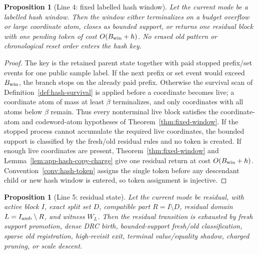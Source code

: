 \documentclass[11pt]{article}
\newtheorem{proposition}[theorem]{Proposition}
\theoremstyle{remark}
\begin{document}
\begin{proposition}[Line 4: fixed labelled hash window]\label{prop:line-hash}
Let the current mode be a labelled hash window.  Then the window either terminalizes on a budget overflow or large coordinate atom, closes as bounded support, or returns one residual block with one pending token of cost $O(B_{\rm win}+h)$.  No erased old pattern or chronological reset order enters the hash key.
\end{proposition}

\begin{proof}
The key is the retained parent state together with paid stopped prefix/set events for one public sample label.  If the next prefix or set event would exceed $B_{\rm win}$, the branch stops on the already paid prefix.  Otherwise the survival scan of Definition~\ref{def:hash-survival} is applied before a coordinate becomes live; a coordinate atom of mass at least $\beta$ terminalizes, and only coordinates with all atoms below $\beta$ remain.  Thus every nonterminal live block satisfies the coordinate-atom and codeword-atom hypotheses of Theorem~\ref{thm:fixed-window}.  If the stopped process cannot accumulate the required live coordinates, the bounded support is classified by the fresh/old residual rules and no token is created.  If enough live coordinates are present, Theorem~\ref{thm:fixed-window} and Lemma~\ref{lem:app-hash-copy-charge} give one residual return at cost $O(B_{\rm win}+h)$.  Convention~\ref{conv:hash-token} assigns the single token before any descendant child or new hash window is entered, so token assignment is injective.
\end{proof}

\begin{proposition}[Line 5: residual state]\label{prop:line-residual}
Let the current mode be residual, with active block $I$, exact split set $D$, compatible part $R=I\setminus D$, residual domain $L=I_{\rm amb}\setminus R$, and witness $W_L$.  Then the residual transition is exhausted by fresh support promotion, dense DRC birth, bounded-support fresh/old classification, sparse old registration, high-revisit exit, terminal value/equality shadow, charged pruning, or scale descent.
\end{proposition}
\end{document}
